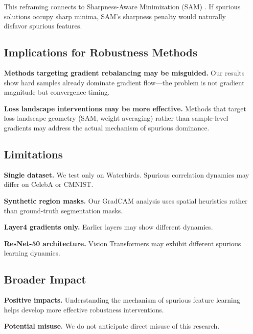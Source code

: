 This reframing connects to Sharpness-Aware Minimization (SAM) \citep{Foret2021Sharpness}. If spurious solutions occupy sharp minima, SAM's sharpness penalty would naturally disfavor spurious features.

\subsection{Implications for Robustness Methods}

\textbf{Methods targeting gradient rebalancing may be misguided.} Our results show hard samples already dominate gradient flow---the problem is not gradient magnitude but convergence timing.

\textbf{Loss landscape interventions may be more effective.} Methods that target loss landscape geometry (SAM, weight averaging) rather than sample-level gradients may address the actual mechanism of spurious dominance.

\subsection{Limitations}

\textbf{Single dataset.} We test only on Waterbirds. Spurious correlation dynamics may differ on CelebA or CMNIST.

\textbf{Synthetic region masks.} Our GradCAM analysis uses spatial heuristics rather than ground-truth segmentation masks.

\textbf{Layer4 gradients only.} Earlier layers may show different dynamics.

\textbf{ResNet-50 architecture.} Vision Transformers may exhibit different spurious learning dynamics.

\subsection{Broader Impact}

\textbf{Positive impacts.} Understanding the mechanism of spurious feature learning helps develop more effective robustness interventions.

\textbf{Potential misuse.} We do not anticipate direct misuse of this research.
